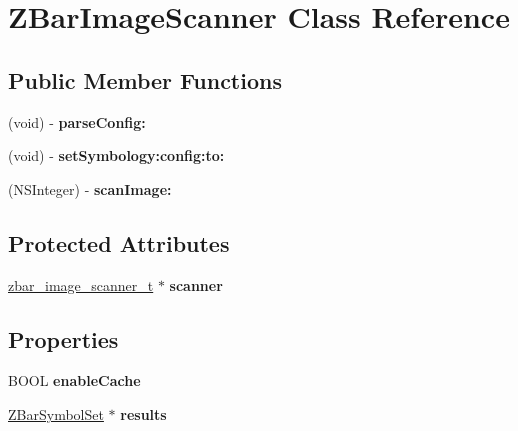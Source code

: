 \hypertarget{interface_z_bar_image_scanner}{
\section{ZBarImageScanner Class Reference}
\label{interface_z_bar_image_scanner}
}
\subsection*{Public Member Functions}
\begin{DoxyCompactItemize}
\item 
\hypertarget{interface_z_bar_image_scanner_a4d27d698da235a70312177150e4381ea}{
(void) -\/ {\bfseries parseConfig:}}
\label{interface_z_bar_image_scanner_a4d27d698da235a70312177150e4381ea}

\item 
\hypertarget{interface_z_bar_image_scanner_a52125e42c6eb6b16c88234a47665b858}{
(void) -\/ {\bfseries setSymbology:config:to:}}
\label{interface_z_bar_image_scanner_a52125e42c6eb6b16c88234a47665b858}

\item 
\hypertarget{interface_z_bar_image_scanner_adfcbdf0e6710aadc05af565add02b78f}{
(NSInteger) -\/ {\bfseries scanImage:}}
\label{interface_z_bar_image_scanner_adfcbdf0e6710aadc05af565add02b78f}

\end{DoxyCompactItemize}
\subsection*{Protected Attributes}
\begin{DoxyCompactItemize}
\item 
\hypertarget{interface_z_bar_image_scanner_a4e9eea301857054df065eb314106972f}{
\hyperlink{zbar_8h_afe85585d1f7e90b1092b0d8420b8f577}{zbar\_\-image\_\-scanner\_\-t} $\ast$ {\bfseries scanner}}
\label{interface_z_bar_image_scanner_a4e9eea301857054df065eb314106972f}

\end{DoxyCompactItemize}
\subsection*{Properties}
\begin{DoxyCompactItemize}
\item 
\hypertarget{interface_z_bar_image_scanner_ac05e8b3a52752a1cfb99dc08f13bb7cb}{
BOOL {\bfseries enableCache}}
\label{interface_z_bar_image_scanner_ac05e8b3a52752a1cfb99dc08f13bb7cb}

\item 
\hypertarget{interface_z_bar_image_scanner_a3dca7fd80c5ae2013ed35992838c87a4}{
\hyperlink{interface_z_bar_symbol_set}{ZBarSymbolSet} $\ast$ {\bfseries results}}
\label{interface_z_bar_image_scanner_a3dca7fd80c5ae2013ed35992838c87a4}

\end{DoxyCompactItemize}


